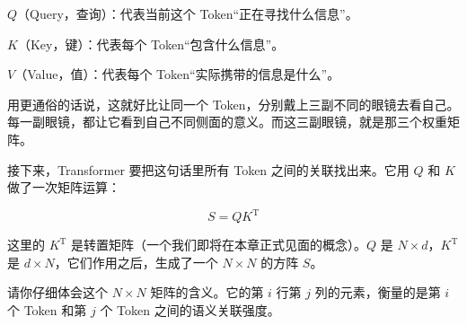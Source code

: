 \documentclass[a4paper,12pt,twoside,openany,fontset=none]{ctexbook}
\numberwithin{equation}{chapter}
\begin{document}
$Q$（Query，查询）：代表当前这个 Token“正在寻找什么信息”。

$K$（Key，键）：代表每个 Token“包含什么信息”。

$V$（Value，值）：代表每个 Token“实际携带的信息是什么”。

\endgroup

用更通俗的话说，这就好比让同一个 Token，分别戴上三副不同的眼镜去看自己。每一副眼镜，都让它看到自己不同侧面的意义。而这三副眼镜，就是那三个权重矩阵。

接下来，Transformer 要把这句话里所有 Token 之间的关联找出来。它用 $Q$ 和 $K$ 做了一次矩阵运算：

\[ S=QK^{\mathrm T} \]

这里的 $K^{\mathrm T}$ 是转置矩阵（一个我们即将在本章正式见面的概念）。$Q$ 是 $N\times d$，$K^{\mathrm T}$ 是 $d\times N$，它们作用之后，生成了一个 $N\times N$ 的方阵 $S$。

请你仔细体会这个 $N\times N$ 矩阵的含义。它的第 $i$ 行第 $j$ 列的元素，衡量的是第 $i$ 个 Token 和第 $j$ 个 Token 之间的语义关联强度。
\end{document}
